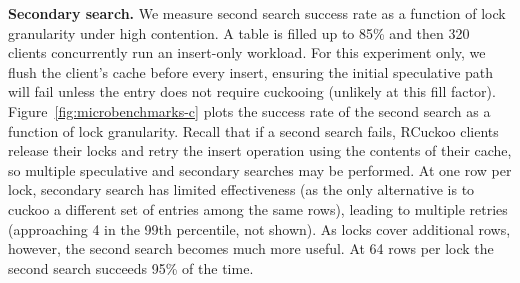 \textbf{Secondary search.}
We measure second search success rate as a function of lock granularity under high contention.  A
table is filled up to 85\% and then 320 clients concurrently run an insert-only workload.  For this
experiment only, we flush the client's cache before every insert, ensuring the initial speculative
path will fail unless the entry does not require cuckooing (unlikely at this fill factor).
Figure~\ref{fig:microbenchmarks-c} plots the success rate of the second search as a function of
lock granularity.   Recall that if a second search
fails, RCuckoo clients release their locks and retry the insert operation using the contents of
their cache, so multiple speculative and secondary searches may be performed.  At one row per lock,
secondary search has limited effectiveness (as the only alternative is to cuckoo a different set of
entries among the same rows), leading to multiple retries (approaching 4 in the 99th percentile, not
shown).  As locks cover additional rows, however, the second search becomes much more
useful.
At 64 rows per lock the second search succeeds 95\% of the time.




